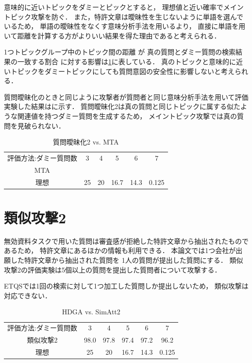 \documentclass[master]{suribt}
\theoremstyle{definition}
\begin{document}
 意味的に近いトピックをダミーとピックとすると，
 理想値と近い確率でメイントピック攻撃を防ぐ．
 また，特許文章は曖昧性を生じないように単語を選んでいるため，
 単語の曖昧性をなくす意味分析手法を用いるより，
 直接に単語を用いて距離を計算する方がよりいい結果を得た理由であると考えられる．

 1つトピックグループ中のトピック間の距離
 が
 真の質問とダミー質問の検索結果の一致する割合
 に対する影響は\ref{}に表している．
 真のトピックと意味的に近いトピックをダミートピックにしても質問意図の安全性に影響しないと考えられる．
 
 質問曖昧化のときと同じように攻撃者が質問者と同じ意味分析手法を用いて評価実験した結果はに示す．
 質問曖昧化2は真の質問と同じトピックに属する似たような関連値を持つダミー質問を生成するため，
 メイントピック攻撃では真の質問を見破られない．

 \begin{table}[!hbp]
 \center
 \begin{tabular}{|c|c|c|c|c|c|}
 \hline
 評価方法:ダミー質問数  & 3 & 4 & 5 & 6 & 7    \\
 MTA &  &  &  &  &  \\
 理想 & 25 & 20 & 16.7 & 14.3 & 0.125 \\
 \hline
 \end{tabular}
 \label{tab:mt:HDGA1}
 \caption{質問曖昧化2 vs. MTA}
 \end{table}

 \section{類似攻撃2}

 無効資料タスクで用いた質問は審査感が拒絶した特許文章から抽出されたものであるため，
 特許文章にあるほかの情報も利用できる．
 本論文では1つ会社が出願した特許文章から抽出された質問を
 1人の質問が提出した質問にする．
 類似攻撃2の評価実験は5個以上の質問を提出した質問者について攻撃する．

 ETQSでは1回の検索に対して1つ加工した質問しか提出しないため，
 類似攻撃は対応できない．

 \begin{table}[!hbp]
 \center
 \begin{tabular}{|c|c|c|c|c|c|}
 \hline
 評価方法:ダミー質問数  & 3 & 4 & 5 & 6 & 7    \\
 類似攻撃2 & 98.0 & 97.8 & 97.4 & 97.2 & 96.2 \\
 理想 & 25 & 20 & 16.7 & 14.3 & 0.125 \\
 \hline
 \end{tabular}
 \label{tab:s2:HDGA}
 \caption{HDGA vs. SimAtt2}
 \end{table}
\end{document}
